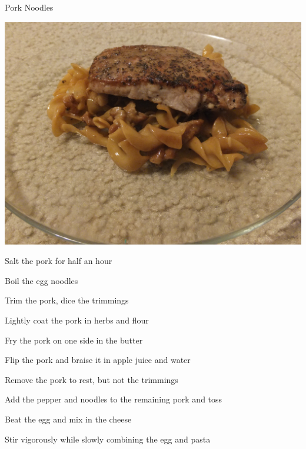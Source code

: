 \documentclass{recipe}
\begin{document}
\begin{recipe}{Pork Noodles}

  \begin{ingredients}
  \end{ingredients}

  \begin{images}
    \begin{image}
      \includegraphics[width=\linewidth,trim=0px 400px 0px 0px, clip=true]{pork_noodles-01.jpeg}
    \end{image}
  \end{images}

  \begin{steps}
  \item Salt the pork for half an hour
  \item Boil the egg noodles
  \item Trim the pork, dice the trimmings
  \item Lightly coat the pork in herbs and flour
  \item Fry the pork on one side in the butter
  \item Flip the pork and braise it in apple juice and water
  \item Remove the pork to rest, but not the trimmings
  \item Add the pepper and noodles to the remaining pork and toss
  \item Beat the egg and mix in the cheese
  \item Stir vigorously while slowly combining the egg and pasta 
  \end{steps}


\end{recipe}
\end{document}
